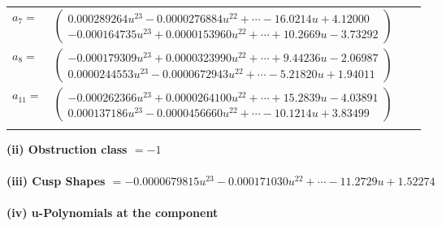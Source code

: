 \documentclass[1p]{elsarticle_modified}
\theoremstyle{definition}
\begin{document}
\begin{tabular}{m{7pt} m{180pt} m{7pt} m{180pt} }
\flushright $a_{7}=$&$\begin{pmatrix}0.000289264 u^{23}-0.0000276884 u^{22}+\cdots-16.0214 u+4.12000\\-0.000164735 u^{23}+0.0000153960 u^{22}+\cdots+10.2669 u-3.73292\end{pmatrix}$ \\
\flushright $a_{8}=$&$\begin{pmatrix}-0.000179309 u^{23}+0.0000323990 u^{22}+\cdots+9.44236 u-2.06987\\0.0000244553 u^{23}-0.0000672943 u^{22}+\cdots-5.21820 u+1.94011\end{pmatrix}$ \\
\flushright $a_{11}=$&$\begin{pmatrix}-0.000262366 u^{23}+0.0000264100 u^{22}+\cdots+15.2839 u-4.03891\\0.000137186 u^{23}-0.0000456660 u^{22}+\cdots-10.1214 u+3.83499\end{pmatrix}$\\&\end{tabular}
\flushleft \textbf{(ii) Obstruction class $= -1$}\\~\\
\flushleft \textbf{(iii) Cusp Shapes $= -0.0000679815 u^{23}-0.000171030 u^{22}+\cdots-11.2729 u+1.52274$}\\~\\
\newpage\renewcommand{\arraystretch}{1}
\flushleft \textbf{(iv) u-Polynomials at the component}\newline \\
\end{document}
